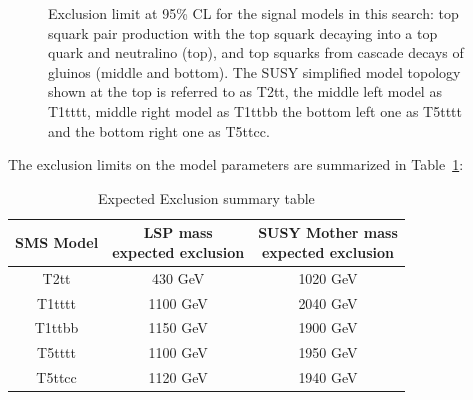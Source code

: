 \begin{figure}[ht!]
\begin{centering}
  \caption{Exclusion limit at 95\% CL for the signal models in this search: top squark pair production with the top squark decaying into a top quark and neutralino (top), and top squarks from cascade decays of gluinos (middle and bottom). The SUSY simplified model topology shown at the top is referred to as T2tt, the middle left model as T1tttt, middle right model as T1ttbb the bottom left one as T5tttt and the bottom right one as T5ttcc.}
  \label{fig:signal_diagrams}
 \end{centering}
\end{figure}

The exclusion limits on the model parameters are summarized in Table~\ref{tab:c4limitsummary}:

\begin{table}[htbp]
\fontsize{10 pt}{1.2 em}
\selectfont
\begin{centering}
\caption{\label{tab:c4limitsummary} Expected Exclusion summary table}
\hspace*{-4ex}
\begin{tabular}{|c|c|c|}
\hline
SMS Model & \specialcell{LSP mass \\ expected exclusion} & \specialcell{SUSY Mother mass \\ expected exclusion} \\
\hline
T2tt & 430 GeV & 1020 GeV \\
\hline
T1tttt & 1100 GeV & 2040 GeV \\
\hline
T1ttbb & 1150 GeV & 1900 GeV \\
\hline
T5tttt & 1100 GeV & 1950 GeV \\
\hline
T5ttcc & 1120 GeV & 1940 GeV \\
\hline
\end{tabular}
\par\end{centering}
\end{table}
